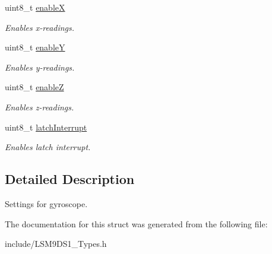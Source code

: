 \begin{DoxyCompactItemize}
\mbox{\label{structgyroSettings_a7c1000d1151579743faa376d49751f1d}} 
uint8\+\_\+t \hyperlink{structgyroSettings_a7c1000d1151579743faa376d49751f1d}{enableX}
\begin{DoxyCompactList}\small\item\em Enables x-\/readings. \end{DoxyCompactList}\item 
\mbox{\label{structgyroSettings_a4d6ea95b7a52daab6d48dc128c83f3d8}} 
uint8\+\_\+t \hyperlink{structgyroSettings_a4d6ea95b7a52daab6d48dc128c83f3d8}{enableY}
\begin{DoxyCompactList}\small\item\em Enables y-\/readings. \end{DoxyCompactList}\item 
\mbox{\label{structgyroSettings_a86a86182fd841bd651672d43803b5c63}} 
uint8\+\_\+t \hyperlink{structgyroSettings_a86a86182fd841bd651672d43803b5c63}{enableZ}
\begin{DoxyCompactList}\small\item\em Enables z-\/readings. \end{DoxyCompactList}\item 
\mbox{\label{structgyroSettings_a3eb9f52cae013b107fbc5059220f9333}} 
uint8\+\_\+t \hyperlink{structgyroSettings_a3eb9f52cae013b107fbc5059220f9333}{latch\+Interrupt}
\begin{DoxyCompactList}\small\item\em Enables latch interrupt. \end{DoxyCompactList}\end{DoxyCompactItemize}


\subsection{Detailed Description}
Settings for gyroscope. 

The documentation for this struct was generated from the following file\+:\begin{DoxyCompactItemize}
\item 
include/L\+S\+M9\+D\+S1\+\_\+\+Types.\+h\end{DoxyCompactItemize}
